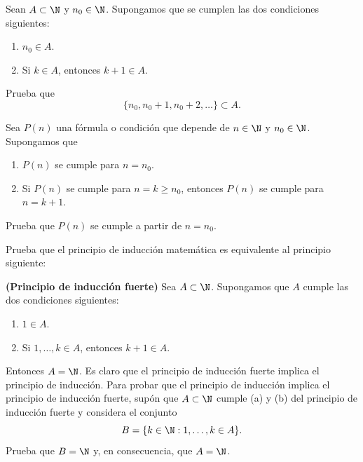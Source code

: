 \documentclass[12pt,a4paper]{book}
\begin{document}
    \begin{ejercicio}\label{ej:66}
        Sean $A\subset\N$ y $n_{0}\in\N$. Supongamos que se cumplen las dos
        condiciones siguientes:
        \begin{enumerate}[nosep]
            \item $n_{0}\in A$.
            \item Si $k\in A$, entonces $k+1\in A$.
        \end{enumerate}
        Prueba que
        \begin{equation*}
            \{n_{0},n_{0}+1,n_{0}+2,\ldots\}\subset A.
        \end{equation*}
    \end{ejercicio}

    \begin{ejercicio}\label{ej:67}
        Sea $P(n)$ una fórmula o condición que depende de $n\in\N$ y
        $n_{0}\in\N$. Supongamos que
        \begin{enumerate}[nosep]
            \item $P(n)$ se cumple para $n=n_{0}$.
            \item Si $P(n)$ se cumple para $n=k\geq n_{0}$, entonces $P(n)$ se cumple para
            $n=k+1$.
        \end{enumerate}
        Prueba que $P(n)$ se cumple a partir de $n=n_{0}$.
    \end{ejercicio}

    \begin{ejercicio}\label{ej:68}
        Prueba que el principio de inducción matemática es equivalente
        al principio siguiente:

        \textbf{(Principio de inducción fuerte)} Sea $A\subset\N$. Supongamos que $A$ cumple
        las dos condiciones siguientes:
        \begin{enumerate}[nosep]
            \item $1\in A$.
            \item Si $1,\ldots,k\in A$, entonces $k+1\in A$.
        \end{enumerate}
        Entonces $A=\N$. \sugerencia Es claro que el principio de inducción fuerte
        implica el principio de inducción. Para probar que el principio de inducción
        implica el principio de inducción fuerte, supón que $A\subset\N$ cumple (a) y (b)
        del principio de inducción fuerte y considera el conjunto
        \begin{equation*}
            B=\{k\in\N:1,\ldots,k\in A\}.
        \end{equation*}
        Prueba que $B=\N$ y, en consecuencia, que $A=\N$.
    \end{ejercicio}
\end{document}
